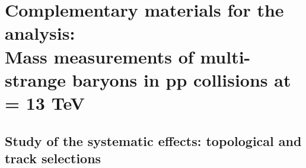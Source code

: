 \mbox{}
\newpage 
\chapter{Complementary materials for the analysis:\\Mass measurements of multi-strange baryons in pp collisions at \sqrtS = 13 TeV}
\label{appendix:CPTAnalysis}

\newpage

\section{Study of the systematic effects: topological and track selections}


